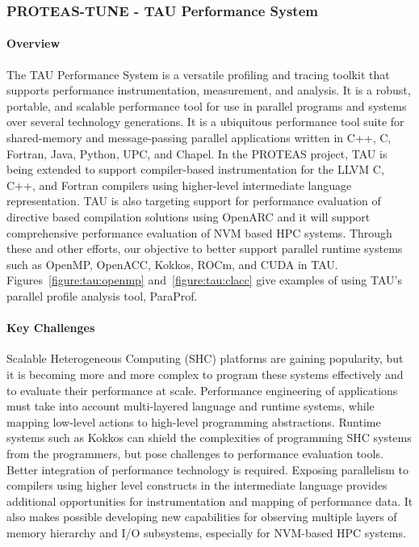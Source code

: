 \subsubsection{ PROTEAS-TUNE - TAU Performance System}\label{subsubsect:tau}

\paragraph{Overview}
The TAU Performance System is a versatile profiling and tracing toolkit that supports performance instrumentation, measurement, and analysis. It is a robust, portable, and scalable performance tool for use in parallel programs and systems over several technology generations. It is a ubiquitous performance tool suite for shared-memory and message-passing parallel applications written in C++, C, Fortran, Java, Python, UPC, and Chapel. In the PROTEAS project, TAU is being extended to support compiler-based instrumentation for the LLVM C, C++, and Fortran compilers using higher-level intermediate language representation. TAU is also targeting support for performance evaluation of directive based compilation solutions using OpenARC and it will support comprehensive performance evaluation of NVM based HPC systems.  Through these and other efforts, our objective to better support parallel runtime systems such as OpenMP, OpenACC, Kokkos, ROCm, and CUDA in TAU. Figures~\ref{figure:tau:openmp} and~\ref{figure:tau:clacc} give  examples of using TAU's parallel profile analysis tool, ParaProf.

\paragraph{Key Challenges}
Scalable Heterogeneous Computing (SHC) platforms are gaining popularity, but it is becoming more and more complex to program these systems effectively and to evaluate their performance at scale. Performance engineering of applications must take into account multi-layered language and runtime systems, while mapping low-level actions to high-level programming abstractions.  Runtime systems such as Kokkos can shield the complexities of programming SHC systems from the programmers, but pose challenges to performance evaluation tools.  Better integration of performance technology is required.  Exposing parallelism to compilers using higher level constructs in the intermediate language provides additional opportunities for instrumentation and mapping of performance data.  It also makes possible developing new capabilities for observing multiple layers of memory hierarchy and I/O subsystems, especially for NVM-based HPC systems.

